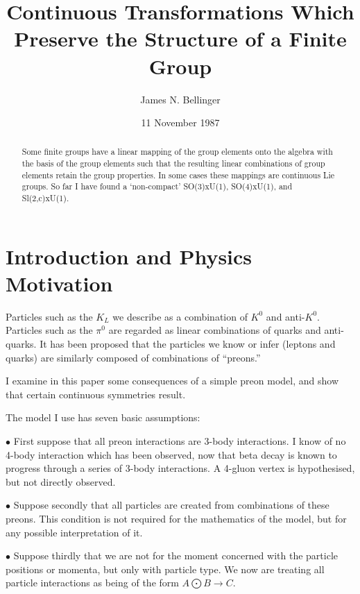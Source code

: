\documentclass[12pt]{article}
\begin{document}
\title{ Continuous Transformations Which Preserve the Structure of a Finite Group}
\author{James N. Bellinger}
\date{11 November 1987}
\maketitle
\begin{abstract}
Some finite groups have a linear mapping
of the group elements onto the algebra with the basis of the group
elements such
that the resulting linear combinations of group elements retain
the group properties.  In some cases these mappings are
continuous Lie groups.  So far I have found
a `non-compact' SO(3)xU(1), SO(4)xU(1), and Sl(2,c)xU(1).
\end{abstract}
\newpage
\pagestyle{plain}

\vskip 2in


\section{ Introduction and Physics Motivation}

\par
  Particles such as the $K_L$ we describe as
a combination of $K^0$ and anti-$K^0$.  
Particles such as the $\pi^0$ are regarded as linear combinations of
quarks and anti-quarks.
It has been proposed that
the particles we know or infer (leptons and quarks) are similarly
composed of combinations of ``preons.''

 I examine in this paper some consequences of a simple preon model,
and show that certain continuous symmetries result.

 The model I use has seven basic assumptions:

 $\bullet$  First suppose that all preon interactions are 3-body interactions.
I know of no 4-body interaction which has been observed, now that
beta decay is known to progress through a series of 3-body interactions.
A 4-gluon vertex is hypothesised, but not directly observed.

 $\bullet$  Suppose secondly that all particles are created from combinations of
these preons.  This condition is not required for the mathematics of
the model, but for any possible interpretation of it.

 $\bullet$  Suppose thirdly that we are not for the moment concerned with the
particle positions or momenta, but only with particle type.  We now are
treating all particle interactions as being of the form $A \bigodot B
\rightarrow C$.
\end{document}
